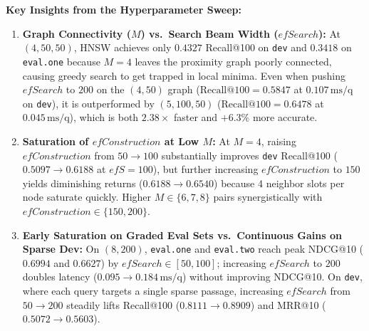 \documentclass[11pt]{article}
\begin{document}
\textbf{Key Insights from the Hyperparameter Sweep:}
\begin{enumerate}
    \item \textbf{Graph Connectivity ($M$) vs.\ Search Beam Width ($\mathit{efSearch}$):} At $(4, 50, 50)$, HNSW achieves only $0.4327$ Recall@100 on \texttt{dev} and $0.3418$ on \texttt{eval.one} because $M=4$ leaves the proximity graph poorly connected, causing greedy search to get trapped in local minima. Even when pushing $\mathit{efSearch}$ to $200$ on the $(4, 50)$ graph ($\text{Recall@100} = 0.5847$ at $0.107\,\text{ms/q}$ on \texttt{dev}), it is outperformed by $(5, 100, 50)$ ($\text{Recall@100} = 0.6478$ at $0.045\,\text{ms/q}$), which is both $2.38\times$ faster and $+6.3\%$ more accurate.
    \item \textbf{Saturation of $\mathit{efConstruction}$ at Low $M$:} At $M=4$, raising $\mathit{efConstruction}$ from $50 \to 100$ substantially improves \texttt{dev} Recall@100 ($0.5097 \to 0.6188$ at $\mathit{efS}=100$), but further increasing $\mathit{efConstruction}$ to $150$ yields diminishing returns ($0.6188 \to 0.6540$) because 4 neighbor slots per node saturate quickly. Higher $M \in \{6, 7, 8\}$ pairs synergistically with $\mathit{efConstruction} \in \{150, 200\}$.
    \item \textbf{Early Saturation on Graded Eval Sets vs.\ Continuous Gains on Sparse Dev:} On $(8, 200)$, \texttt{eval.one} and \texttt{eval.two} reach peak NDCG@10 ($0.6994$ and $0.6627$) by $\mathit{efSearch} \in [50, 100]$; increasing $\mathit{efSearch}$ to $200$ doubles latency ($0.095 \to 0.184\,\text{ms/q}$) without improving NDCG@10. On \texttt{dev}, where each query targets a single sparse passage, increasing $\mathit{efSearch}$ from $50 \to 200$ steadily lifts Recall@100 ($0.8111 \to 0.8909$) and MRR@10 ($0.5072 \to 0.5603$).
\end{enumerate}
\end{document}
